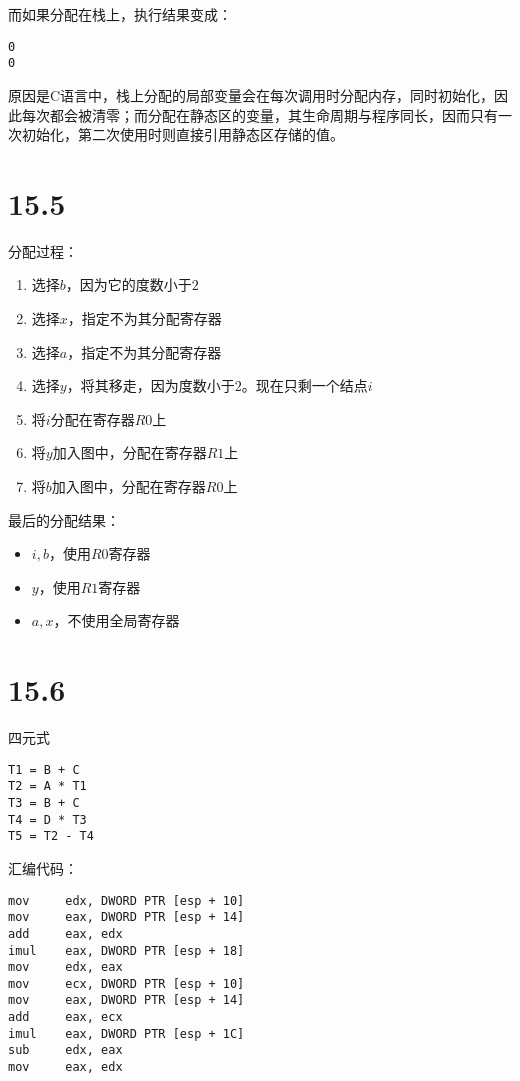 \documentclass[UTF8]{ctexart}
\begin{document}
    而如果分配在栈上，执行结果变成：
    \begin{lstlisting}
0
0
    \end{lstlisting}

    原因是C语言中，栈上分配的局部变量会在每次调用时分配内存，同时初始化，因此每次都会被清零；而分配在静态区的变量，其生命周期与程序同长，因而只有一次初始化，第二次使用时则直接引用静态区存储的值。

\section*{15.5}

    分配过程：
    \begin{enumerate}
        \item 选择$b$，因为它的度数小于$2$
        \item 选择$x$，指定不为其分配寄存器
        \item 选择$a$，指定不为其分配寄存器
        \item 选择$y$，将其移走，因为度数小于$2$。现在只剩一个结点$i$
        \item 将$i$分配在寄存器$R0$上
        \item 将$y$加入图中，分配在寄存器$R1$上
        \item 将$b$加入图中，分配在寄存器$R0$上
    \end{enumerate}

    最后的分配结果：
    \begin{itemize}
        \item $i, b$，使用$R0$寄存器
        \item $y$，使用$R1$寄存器
        \item $a, x$，不使用全局寄存器
    \end{itemize}

\section*{15.6}
    四元式
    \begin{lstlisting}
T1 = B + C
T2 = A * T1
T3 = B + C
T4 = D * T3
T5 = T2 - T4
    \end{lstlisting}

    汇编代码：
    \begin{lstlisting}
mov     edx, DWORD PTR [esp + 10]
mov     eax, DWORD PTR [esp + 14]
add     eax, edx
imul    eax, DWORD PTR [esp + 18]
mov     edx, eax
mov     ecx, DWORD PTR [esp + 10]
mov     eax, DWORD PTR [esp + 14]
add     eax, ecx
imul    eax, DWORD PTR [esp + 1C]
sub     edx, eax
mov     eax, edx
    \end{lstlisting}
\end{document}
